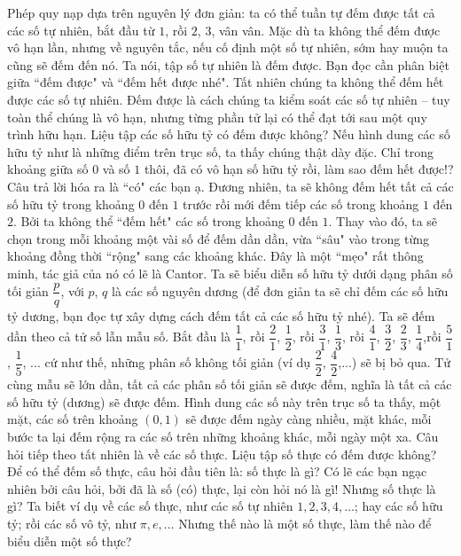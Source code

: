 \begin{multicols}{2}	
	Phép quy nạp dựa trên nguyên lý đơn giản: ta có thể tuần tự đếm được tất cả các số tự nhiên, bắt đầu từ $1$, rồi $2$, $3$, vân vân. Mặc dù ta không thể đếm được vô hạn lần, nhưng về nguyên tắc, nếu cố định một số tự nhiên, sớm hay muộn ta cũng sẽ đếm đến nó. Ta nói, tập số tự nhiên là đếm được. Bạn đọc cần phân biệt giữa ``đếm được" và ``đếm hết được nhé". Tất nhiên chúng ta không thể đếm hết được các số tự nhiên. Đếm được là cách chúng ta kiểm soát các số tự nhiên -- tuy toàn thể chúng là vô hạn, nhưng từng phần tử lại có thể đạt tới sau một quy trình hữu hạn. 
	\vskip 0.1cm
	Liệu tập các số hữu tỷ có đếm được không? Nếu hình dung các số hữu tỷ như là những điểm trên trục số, ta thấy chúng thật dày đặc. Chỉ trong khoảng giữa số $0$ và số $1$ thôi, đã có vô hạn số hữu tỷ rồi, làm sao đếm hết được!?
	\vskip 0.1cm
	Câu trả lời hóa ra là ``có" các bạn ạ. Đương nhiên, ta sẽ không đếm hết tất cả các số hữu tỷ trong khoảng $0$ đến $1$ trước rồi mới đếm tiếp các số trong khoảng $1$ đến $2$. Bởi ta không thể ``đếm hết" các số trong khoảng $0$ đến $1$. Thay vào đó, ta sẽ chọn trong mỗi khoảng một vài số để đếm dần dần, vừa ``sâu" vào trong từng khoảng đồng thời ``rộng" sang các khoảng khác. 
	\vskip 0.1cm
	Đây là một ``mẹo" rất thông minh, tác giả của nó có lẽ là Cantor. Ta sẽ biểu diễn số hữu tỷ dưới dạng phân số tối giản $\dfrac{p}{q}$, với $p$, $q$ là các số nguyên dương (để đơn giản ta sẽ chỉ đếm các số hữu tỷ dương, bạn đọc tự xây dựng cách đếm tất cả các số hữu tỷ nhé). Ta sẽ đếm dần theo cả tử số lẫn mẫu số. Bắt đầu là $\dfrac{1}{1}$, rồi $\dfrac{2}{1}$, $\dfrac{1}{2}$, rồi $\dfrac{3}{1}$, $\dfrac{1}{3}$, rồi $\dfrac{4}{1}$, $\dfrac{3}{2}$, $\dfrac{2}{3}$, $\dfrac{1}{4}$,rồi $\dfrac{5}{1}$, $\dfrac{1}{5}$, ... cứ như thế, những phân số không tối giản (ví dụ $\dfrac{2}{2}$, $\dfrac{4}{2}$,...) sẽ bị bỏ qua. Tử cùng mẫu sẽ lớn dần, tất cả các phân số tối giản sẽ được đếm, nghĩa là tất cả các số hữu tỷ (dương) sẽ được đếm. 
	\vskip 0.1cm
	Hình dung các số này trên trục số ta thấy, một mặt, các số trên khoảng $(0,1)$ sẽ được đếm ngày càng nhiều, mặt khác, mỗi bước ta lại đếm rộng ra các số trên những khoảng khác, mỗi ngày một xa. 
	\vskip 0.1cm
	Câu hỏi tiếp theo tất nhiên là về các số thực. Liệu tập số thực có đếm được không? 
	\vskip 0.1cm
	Để có thể đếm số thực, câu hỏi đầu tiên là: số thực là gì? Có lẽ các bạn ngạc nhiên bởi câu hỏi, bởi đã là số (có) thực, lại còn hỏi nó là gì! 
	\vskip 0.1cm
	Nhưng số thực là gì?
	\vskip 0.1cm
	Ta biết ví dụ về các số thực, như các số tự nhiên $1,2,3,4, \ldots$; hay các số hữu tỷ; rồi các số vô tỷ, như $\pi, e,\ldots$ Nhưng thế nào là một số thực, làm thế nào để biểu diễn một số thực?
	\end{multicols}
